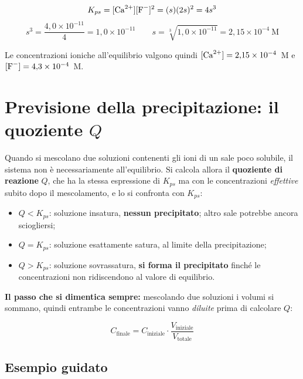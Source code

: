 \documentclass[11pt, a4paper, openright]{book}
\begin{document}
\begin{equation*}
  K_{ps} = [\ce{Ca^2+}][\ce{F-}]^2 = (s)(2s)^2 = 4s^3
\end{equation*}
\begin{equation*}
  s^3 = \frac{4{,}0 \times 10^{-11}}{4} = 1{,}0 \times 10^{-11}
  \qquad
  s = \sqrt[3]{1{,}0 \times 10^{-11}} = 2{,}15 \times 10^{-4} \ \text{M}
\end{equation*}

Le concentrazioni ioniche all'equilibrio valgono quindi
$[\ce{Ca^2+}] = 2{,}15 \times 10^{-4}$~M e $[\ce{F-}] = 4{,}3 \times 10^{-4}$~M.


\section{Previsione della precipitazione: il quoziente $Q$}

Quando si mescolano due soluzioni contenenti gli ioni di un sale poco solubile, il sistema
non è necessariamente all'equilibrio. Si calcola allora il \textbf{quoziente di reazione}
$Q$, che ha la stessa espressione di $K_{ps}$ ma con le concentrazioni \emph{effettive}
subito dopo il mescolamento, e lo si confronta con $K_{ps}$:

\begin{itemize}
  \item $Q < K_{ps}$: soluzione insatura, \textbf{nessun precipitato}; altro sale
        potrebbe ancora sciogliersi;
  \item $Q = K_{ps}$: soluzione esattamente satura, al limite della precipitazione;
  \item $Q > K_{ps}$: soluzione sovrassatura, \textbf{si forma il precipitato} finché le
        concentrazioni non ridiscendono al valore di equilibrio.
\end{itemize}

\noindent\textbf{Il passo che si dimentica sempre:} mescolando due soluzioni i volumi si
sommano, quindi entrambe le concentrazioni vanno \emph{diluite} prima di calcolare $Q$:

\begin{equation}
  C_{\text{finale}} = C_{\text{iniziale}} \cdot \frac{V_{\text{iniziale}}}{V_{\text{totale}}}
\end{equation}

\subsection{Esempio guidato}
\end{document}

